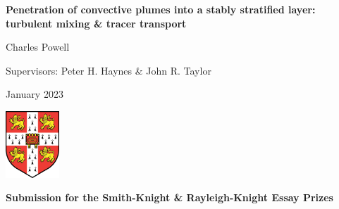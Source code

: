 \documentclass[a4paper]{article}
\begin{document}
\begin{titlepage} 
	\begin{center}
		\noindent\hrulefill

		{\huge \bf Penetration of convective plumes into a stably stratified layer: turbulent
			mixing \& tracer transport}\\
		\noindent\hrulefill

		\vspace{1em}

		{\Large Charles Powell}\\

		\vspace{1em}

		{\large Supervisors: Peter H. Haynes \& John R. Taylor} \\

		\vspace{1em}

		{\large January 2023}

		\vspace{3em}

		\includegraphics[width=0.15\textwidth]{cam}

		\vspace{2em}

		{\bf Submission for the Smith-Knight \& Rayleigh-Knight Essay Prizes} \\


	\end{center}
	\vfill


\end{titlepage}
\end{document}
